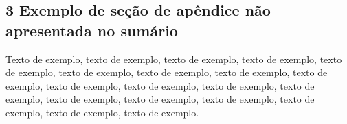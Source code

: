 \documentclass[
	12pt,				%
	oneside,			%
	a4paper,			%
	english,			%
	brazil				%
	]{abntex2ppgsi}
\begin{document}
\begin{apendicesenv}
\section*{3 Exemplo de seção de apêndice não apresentada no sumário}

Texto de exemplo, texto de exemplo, texto de exemplo, texto de exemplo, texto de exemplo, texto de exemplo, texto de exemplo, texto de exemplo, texto de exemplo, texto de exemplo, texto de exemplo, texto de exemplo, texto de exemplo, texto de exemplo, texto de exemplo, texto de exemplo, texto de exemplo, texto de exemplo, texto de exemplo.




\end{apendicesenv}


\end{document}
